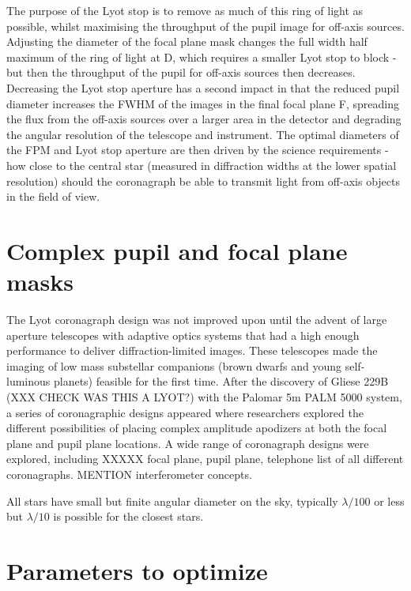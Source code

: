 \documentclass[letterpaper]{ar-1col}
\begin{document}
The purpose of the Lyot stop is to remove as much of this ring of light as possible, whilst maximising the throughput of the pupil image for off-axis sources.
%
Adjusting the diameter of the focal plane mask changes the full width half maximum of the ring of light at D, which requires a smaller Lyot stop to block - but then the throughput of the pupil for off-axis sources then decreases.
%
Decreasing the Lyot stop aperture has a second impact in that the reduced pupil diameter increases the FWHM of the images in the final focal plane F, spreading the flux from the off-axis sources over a larger area in the detector and degrading the angular resolution of the telescope and instrument.
%
The optimal diameters of the FPM and Lyot stop aperture are then driven by the science requirements - how close to the central star (measured in diffraction widths at the lower spatial resolution) should the coronagraph be able to transmit light from off-axis objects in the field of view.



\section{Complex pupil and focal plane masks}

The Lyot coronagraph design was not improved upon until the advent of large aperture telescopes with adaptive optics systems that had a high enough performance to deliver diffraction-limited images.
%
These telescopes made the imaging of low mass substellar companions (brown dwarfs and young self-luminous planets) feasible for the first time.
%
After the discovery of Gliese 229B (XXX CHECK WAS THIS A LYOT?) with the Palomar 5m PALM 5000 system, a series of coronagraphic designs appeared where researchers explored the different possibilities of placing complex amplitude apodizers at both the focal plane and pupil plane locations.
%
A wide range of coronagraph designs were explored, including XXXXX focal plane, pupil plane, telephone list of all different coronagraphs.
%
MENTION interferometer concepts.

All stars have small but finite angular diameter on the sky, typically $\lambda/100$ or less but $\lambda/10$ is possible for the closest stars.
%




\lipsum[2-4]

\section{Parameters to optimize}
\lipsum[2-4]
\end{document}

